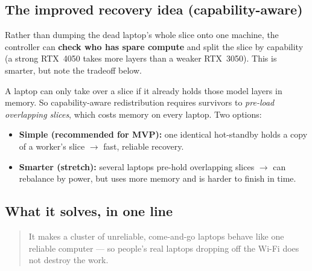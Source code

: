 \subsection{The improved recovery idea (capability-aware)}
Rather than dumping the dead laptop's whole slice onto one machine, the
controller can \textbf{check who has spare compute} and split the slice by
capability (a strong RTX~4050 takes more layers than a weaker RTX~3050). This is
smarter, but note the tradeoff below.

 A laptop can only take over a slice if it
already holds those model layers in memory. So capability-aware redistribution
requires survivors to \emph{pre-load overlapping slices}, which costs memory on
every laptop. Two options:
\begin{itemize}[leftmargin=1.4em,nosep]
  \item \textbf{Simple (recommended for MVP):} one identical hot-standby holds a
  copy of a worker's slice $\rightarrow$ fast, reliable recovery.
  \item \textbf{Smarter (stretch):} several laptops pre-hold overlapping slices
  $\rightarrow$ can rebalance by power, but uses more memory and is harder to
  finish in time.
\end{itemize}

\subsection{What it solves, in one line}
\begin{quote}
It makes a cluster of unreliable, come-and-go laptops behave like one reliable
computer --- so people's real laptops dropping off the Wi-Fi does not destroy
the work.
\end{quote}
